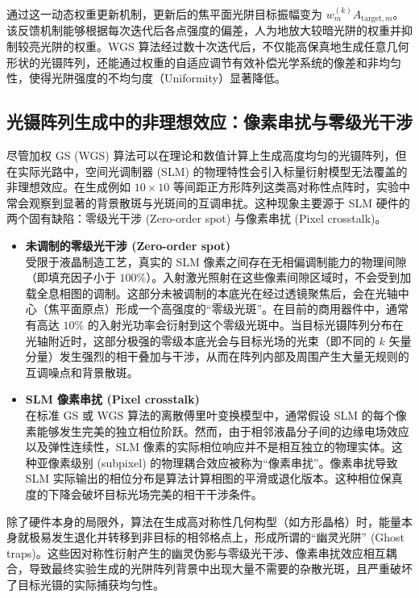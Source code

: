 \documentclass[../main.tex]{subfiles}
\begin{document}
通过这一动态权重更新机制，更新后的焦平面光阱目标振幅变为 $w_m^{(k)} A_{\text{target}, m}$。该反馈机制能够根据每次迭代后各点强度的偏差，人为地放大较暗光阱的权重并抑制较亮光阱的权重。WGS 算法经过数十次迭代后，不仅能高保真地生成任意几何形状的光镊阵列，还能通过权重的自适应调节有效补偿光学系统的像差和非均匀性，使得光阱强度的不均匀度（Uniformity）显著降低。


\subsection{光镊阵列生成中的非理想效应：像素串扰与零级光干涉}
尽管加权 GS (WGS) 算法可以在理论和数值计算上生成高度均匀的光镊阵列，但在实际光路中，空间光调制器 (SLM) 的物理特性会引入标量衍射模型无法覆盖的非理想效应。在生成例如 $10 \times 10$ 等间距正方形阵列这类高对称性点阵时，实验中常会观察到显著的背景散斑与光斑间的互调串扰。这种现象主要源于 SLM 硬件的两个固有缺陷：零级光干涉 (Zero-order spot) 与像素串扰 (Pixel crosstalk)。

\begin{itemize}
    \item \textbf{未调制的零级光干涉 (Zero-order spot)} \\
    受限于液晶制造工艺，真实的 SLM 像素之间存在无相偏调制能力的物理间隙（即填充因子小于 $100\%$）。入射激光照射在这些像素间隙区域时，不会受到加载全息相图的调制。这部分未被调制的本底光在经过透镜聚焦后，会在光轴中心（焦平面原点）形成一个高强度的“零级光斑”。在目前的商用器件中，通常有高达 $10\%$ 的入射光功率会衍射到这个零级光斑中。当目标光镊阵列分布在光轴附近时，这部分极强的零级本底光会与目标光场的光束（即不同的 $k$ 矢量分量）发生强烈的相干叠加与干涉，从而在阵列内部及周围产生大量无规则的互调噪点和背景散斑。

    \item \textbf{SLM 像素串扰 (Pixel crosstalk)} \\
    在标准 GS 或 WGS 算法的离散傅里叶变换模型中，通常假设 SLM 的每个像素能够发生完美的独立相位阶跃。然而，由于相邻液晶分子间的边缘电场效应以及弹性连续性，SLM 像素的实际相位响应并不是相互独立的物理实体。这种亚像素级别 (subpixel) 的物理耦合效应被称为“像素串扰”。像素串扰导致 SLM 实际输出的相位分布是算法计算相图的平滑或退化版本。这种相位保真度的下降会破坏目标光场完美的相干干涉条件。
\end{itemize}

除了硬件本身的局限外，算法在生成高对称性几何构型（如方形晶格）时，能量本身就极易发生退化并转移到非目标的相邻格点上，形成所谓的“幽灵光阱” (Ghost traps)。这些因对称性衍射产生的幽灵伪影与零级光干涉、像素串扰效应相互耦合，导致最终实验生成的光阱阵列背景中出现大量不需要的杂散光斑，且严重破坏了目标光镊的实际捕获均匀性。
\end{document}
